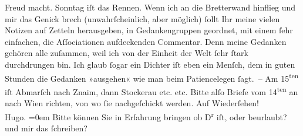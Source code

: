 \begin{ledgroupsized}[t]{13cm}
               Freud macht. Sonntag iſt das Rennen. Wenn ich an die Bretterwand hinflieg und mir das
               Genick brech (unwahrſcheinlich, {\pb}aber möglich) ſollt Ihr meine vielen Notizen auf Zetteln herausgeben, in
               Gedankengruppen geordnet, mit einem ſehr einfachen, die Aſſociationen aufdeckenden
               Commentar. Denn meine Gedanken gehören alle zuſammen, weil ich von der Einheit der
               Welt ſehr ſtark durchdrungen bin. Ich glaub ſogar ein Dichter iſt eben ein Menſch,
               dem in guten Stunden die Gedanken »ausgehen« wie man beim Patiencelegen ſagt. – Am
                     15\textsuperscript{ten} iſt Abmarſch {\pb}nach Znaim, dann Stockerau etc. etc. Bitte alſo Briefe vom 14\textsuperscript{ten} an nach Wien richten, von wo ſie
               nachgeſchickt werden.\pend
           \pstart
           Auf Wiederſehen!{\\[\baselineskip]}\spacefill\mbox{Hugo.}\pend
           \leftskip=0em{}\pstart
           \noindent{}Bitte können Sie in Erfahrung bringen ob D\textsuperscript{r}{ }\label{K_L00471-1v}\label{K_L00471-1h} iſt, oder beurlaubt? und mir das ſchreiben? \pend
           
         
         \endnumbering{}\end{ledgroupsized}  \newcommand{\dateiname}{L00471}\newcommand{\titel}{Hugo von Hofmannsthal an Arthur Schnitzler, 9. 8. [1895]}\newcommand{\editorInnen}{Martin Anton Müller und Gerd-Hermann Susen}
      